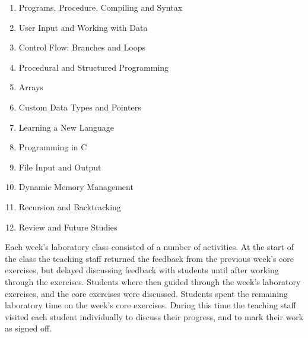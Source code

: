 \begin{enumerate}
  \item Programs, Procedure, Compiling and Syntax
  \item User Input and Working with Data
  \item Control Flow: Branches and Loops
  \item Procedural and Structured Programming
  \item Arrays
  \item Custom Data Types and Pointers
  \item Learning a New Language
  \item Programming in C
  \item File Input and Output
  \item Dynamic Memory Management
  \item Recursion and Backtracking
  \item Review and Future Studies
\end{enumerate}

Each week's laboratory class consisted of a number of activities. At the start of the class the teaching staff returned the feedback from the previous week's core exercises, but delayed discussing feedback with students until after working through the exercises. Students where then guided through the week's laboratory exercises, and the core exercises were discussed. Students spent the remaining laboratory time on the week's core exercises. During this time the teaching staff visited each student individually to discuss their progress, and to mark their work as signed off.

